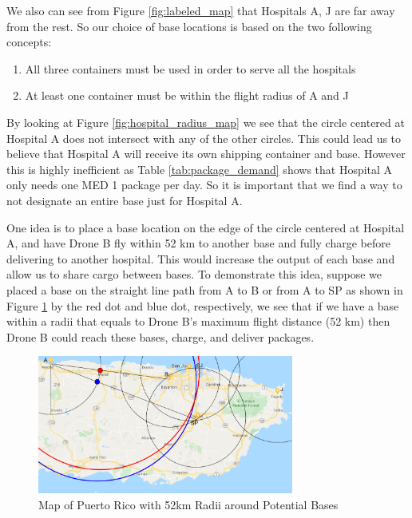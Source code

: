 We also can see from Figure \ref{fig:labeled_map} that Hospitals A, J are far away from the rest. So our choice of base locations is based on the two following concepts:
\begin{enumerate}
    \item All three containers must be used in order to serve all the hospitals
    \item At least one container must be within the flight radius of A and J
\end{enumerate}

By looking at Figure \ref{fig:hospital_radius_map} we see that the circle centered at Hospital A does not intersect with any of the other circles. This could lead us to believe that Hospital A will receive its own shipping container and base. However this is highly inefficient as Table \ref{tab:package_demand} shows that Hospital A only needs one MED 1 package per day. So it is important that we find a way to not designate an entire base just for Hospital A. 

One idea is to place a base location on the edge of the circle centered at Hospital A, and have Drone B fly within 52 km to another base and fully charge before delivering to another hospital. This would increase the output of each base and allow us to share cargo between bases. To demonstrate this idea, suppose we placed a base on the straight line path from A to B or from A to SP as shown in Figure \ref{fig:base_A_radius_map} by the red dot and blue dot, respectively, we see that if we have a base within a radii that equals to Drone B's maximum flight distance (52 km) then Drone B could reach these bases, charge, and deliver packages.

\begin{figure}[!ht]
    \centering
    \includegraphics[width=0.75\textwidth]{base_A_radius_map.png}
    \caption{Map of Puerto Rico with 52km Radii around Potential Bases}
    \label{fig:base_A_radius_map}
\end{figure}


